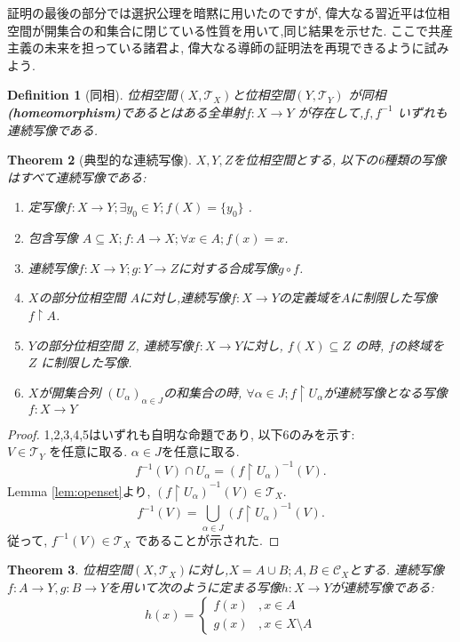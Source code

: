 \documentclass[dvipdfmx]{jbook}
\newtheorem{theorem}{Theorem}[section]
\newtheorem{definition}[theorem]{Definition}
\theoremstyle{remark}
\theoremstyle{plain}
\begin{document}
証明の最後の部分では選択公理を暗黙に用いたのですが, 偉大なる習近平は位相空間が開集合の和集合に閉じている性質を用いて,同じ結果を示せた. ここで共産主義の未来を担っている諸君よ, 偉大なる導師の証明法を再現できるように試みよう.

\begin{definition}[同相]
	位相空間$\left( X,\mathcal{T}_X \right) $と位相空間$\left( Y,\mathcal{T}_Y \right) $ が同相\textbf{(homeomorphism)}であるとはある全単射$f:X\to Y$ が存在して,$f,f^{-1}$ いずれも連続写像である.  
\end{definition}










\begin{theorem}[典型的な連続写像]
	$X,Y,Z$を位相空間とする, 以下の6種類の写像はすべて連続写像である:
	 \begin{enumerate}
		\item 定写像$f: X \to Y; \exists y_0 \in Y ; f(X) =\{y_0\} $ .
		\item 包含写像 $A\subseteq X ; f: A \to X; \forall x \in A; f(x)=x$.
		\item 連続写像$f:X\to Y; g:Y\to Z$に対する合成写像$g\circ f$.
		\item $X$の部分位相空間 $A$に対し,連続写像$f:X\to Y$の定義域を$A$に制限した写像 $f\upharpoonright A$.
		\item  $Y$の部分位相空間 $Z$, 連続写像$f:X \to Y$に対し, $f\left( X \right) \subseteq Z$ の時, $f$の終域を $Z$ に制限した写像.
		\item $X$が開集合列 $\left(U_{\alpha}\right) _{\alpha \in J}$の和集合の時,  $\forall \alpha \in J; f\upharpoonright U_{\alpha}$が連続写像となる写像 $f:X \to Y$
	\end{enumerate}
\end{theorem}

\begin{proof}
	1,2,3,4,5はいずれも自明な命題であり, 以下6のみを示す:\\
	$V \in \mathcal{T}_Y$ を任意に取る. $\alpha \in J$を任意に取る.
	\[
	f^{-1}(V)\cap U_{\alpha} = (f\upharpoonright U_{\alpha})^{-1}(V)
	.\] 
	Lemma \ref{lem:openset}より, $ (f\upharpoonright U_{\alpha})^{-1}(V) \in \mathcal{T}_X$.
	\[
	f^{-1}(V)=\bigcup_{\alpha \in J}  (f\upharpoonright U_{\alpha})^{-1}(V)
	.\]
	従って, $f^{-1}(V) \in \mathcal{T}_X$ であることが示された.
\end{proof}

\begin{theorem}
\label{thm:paste}
	位相空間$(X,\mathcal{T}_X)$に対し,$X=A \cup B; A,B \in \mathcal{C}_X$とする. 連続写像$f:A\to Y,g:B\to Y$を用いて次のように定まる写像$h :X\to Y $が連続写像である:
	\[
	h\left( x\right) =
	\begin{cases}
		f(x) &,x \in A\\
		g(x) &,x \in X\setminus A
	\end{cases}
	\] 
\end{theorem}
\end{document}
